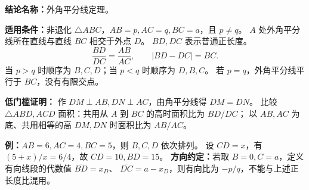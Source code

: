 \textbf{结论名称：}外角平分线定理。

\textbf{适用条件：}非退化 $\triangle ABC$，$AB=p,AC=q,BC=a$，且 $p\ne q$。
$A$ 处外角平分线所在直线与直线 $BC$ 相交于外点 $D$。
$BD,DC$ 表示普通正长度。
\[
 \boxed{\frac{BD}{DC}=\frac{AB}{AC}},\qquad |BD-DC|=BC.
\]
当 $p>q$ 时顺序为 $B,C,D$；当 $p<q$ 时顺序为 $D,B,C$。
若 $p=q$，外角平分线平行于 $BC$，没有有限交点。

\textbf{低门槛证明：} 作 $DM\perp AB,DN\perp AC$，由角平分线得 $DM=DN$。
比较 $\triangle ABD,ACD$ 面积：共用从 $A$ 到 $BC$ 的高时面积比为 $BD/DC$；
以 $AB,AC$ 为底、共用相等的高 $DM,DN$ 时面积比为 $AB/AC$。

\textbf{例：}$AB=6,AC=4,BC=5$，则 $B,C,D$ 依次排列。
设 $CD=x$，有 $(5+x)/x=6/4$，故 $CD=10,BD=15$。
\textbf{方向约定：}若取 $B=0,C=a$，定义有向线段的代数值 $\overline{BD}=x_D$、
$\overline{DC}=a-x_D$，则有向比为 $-p/q$，不能与上述正长度比混用。
